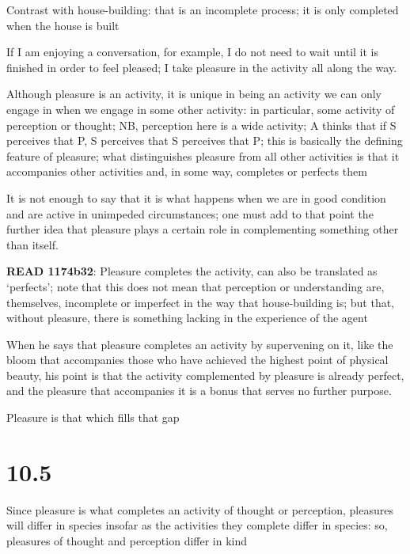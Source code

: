 \documentclass[11pt]{article}
\begin{document}
\noindent Contrast with house-building: that is an incomplete process; it is only completed when the house is built
\vspace*{2mm}

\noindent If I am enjoying a conversation, for example, I do not need to wait until it is finished in order to feel pleased; I take pleasure in the activity all along the way.
\vspace*{2mm}

\noindent Although pleasure is an activity, it is unique in being an activity we can only engage in when we engage in some other activity: in particular, some activity of perception or thought; NB, perception here is a wide activity; A thinks that if S perceives that P, S perceives that S perceives that P; this is basically the defining feature of pleasure; what distinguishes pleasure from all other activities is that it accompanies other activities and, in some way, completes or perfects them
\vspace*{2mm}

\noindent It is not enough to say that it is what happens when we are in good condition and are active in unimpeded circumstances; one must add to that point the further idea that pleasure plays a certain role in complementing something other than itself.
\vspace*{2mm}

\noindent\textbf{READ 1174b32}: Pleasure completes the activity, can also be translated as `perfects'; note that this does not mean that perception or understanding are, themselves, incomplete or imperfect in the way that house-building is; but that, without pleasure, there is something lacking in the experience of the agent
\vspace*{2mm}

\noindent When he says that pleasure completes an activity by supervening on it, like the bloom that accompanies those who have achieved the highest point of physical beauty, his point is that the activity complemented by pleasure is already perfect, and the pleasure that accompanies it is a bonus that serves no further purpose.
\vspace*{2mm}

\noindent Pleasure is that which fills that gap

\section{10.5}

\noindent Since pleasure is what completes an activity of thought or perception, pleasures will differ in species insofar as the activities they complete differ in species: so, pleasures of thought and perception differ in kind
\vspace*{2mm}
\end{document}
